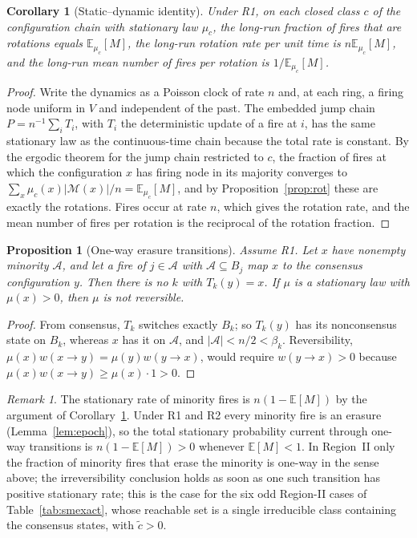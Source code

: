\documentclass[aps,pre,onecolumn,superscriptaddress,amsmath,amssymb,longbibliography]{revtex4-2}
\newtheorem{proposition}[theorem]{Proposition}
\newtheorem{corollary}[theorem]{Corollary}
\theoremstyle{definition}
\theoremstyle{remark}
\newtheorem{remark}[theorem]{Remark}
\newcommand{\ctil}{\tilde c}
\newcommand{\E}{\mathbb{E}}
\begin{document}
\begin{corollary}[Static--dynamic identity]
\label{cor:dual}
Under R1, on each closed class $c$ of the configuration chain with
stationary law $\mu_c$, the long-run fraction of fires that are rotations
equals $\E_{\mu_c}[M]$, the long-run rotation rate per unit time is
$n\E_{\mu_c}[M]$, and the long-run mean number of fires per rotation is
$1/\E_{\mu_c}[M]$.
\end{corollary}
\begin{proof}
Write the dynamics as a Poisson clock of rate $n$ and, at each ring, a
firing node uniform in $V$ and independent of the past. The embedded
jump chain $P=n^{-1}\sum_iT_i$, with $T_i$ the deterministic update of a
fire at $i$, has the same stationary law as the continuous-time chain
because the total rate is constant. By the ergodic theorem for the jump
chain restricted to $c$, the fraction of fires at which the configuration
$x$ has firing node in its majority converges to
$\sum_x\mu_c(x)|\mathcal M(x)|/n=\E_{\mu_c}[M]$, and by
Proposition~\ref{prop:rot} these are exactly the rotations. Fires occur
at rate $n$, which gives the rotation rate, and the mean number of fires
per rotation is the reciprocal of the rotation fraction.
\end{proof}

\begin{proposition}[One-way erasure transitions]
\label{prop:irrev}
Assume R1. Let $x$ have nonempty minority $\mathcal A$, and let a fire of
$j\in\mathcal A$ with $\mathcal A\subseteq B_j$ map $x$ to the consensus
configuration $y$. Then there is no $k$ with $T_k(y)=x$. If $\mu$ is a
stationary law with $\mu(x)>0$, then $\mu$ is not reversible.
\end{proposition}
\begin{proof}
From consensus, $T_k$ switches exactly $B_k$; so $T_k(y)$ has its
nonconsensus state on $B_k$, whereas $x$ has it on $\mathcal A$, and
$|\mathcal A|<n/2<\beta_k$. Reversibility,
$\mu(x)w(x\to y)=\mu(y)w(y\to x)$, would require $w(y\to x)>0$ because
$\mu(x)w(x\to y)\ge\mu(x)\cdot1>0$.
\end{proof}

\begin{remark}
\label{rem:currents}
The stationary rate of minority fires is $n(1-\E[M])$ by the argument of
Corollary~\ref{cor:dual}. Under R1 and R2 every minority fire is an
erasure (Lemma~\ref{lem:epoch}), so the total stationary probability
current through one-way transitions is $n(1-\E[M])>0$ whenever
$\E[M]<1$. In Region~II only the fraction of minority fires that erase
the minority is one-way in the sense above; the irreversibility
conclusion holds as soon as one such transition has positive stationary
rate; this is the case for the six odd Region-II cases of
Table~\ref{tab:smexact}, whose reachable set is a single irreducible
class containing the consensus states, with $\ctil>0$.
\end{remark}
\end{document}
